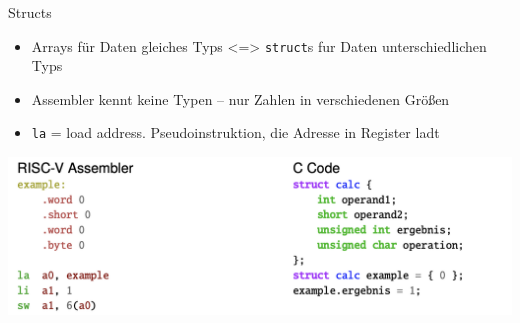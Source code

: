 \documentclass[
  german,            %
  aspectratio=169,    %
]{tumbeamer}
\begin{document}
\begin{frame}[c]{Structs}{}
  \begin{itemize}
    \item Arrays für Daten gleiches Typs <=> \texttt{struct}s fur Daten unterschiedlichen Typs 
    \item Assembler kennt keine Typen -- nur Zahlen in verschiedenen Größen
    \item \texttt{la} = load address. Pseudoinstruktion, die Adresse in Register ladt
  \end{itemize}
  \vspace{0.4cm}
  \includegraphics[width=\linewidth]{strutcs_comparison.png}
\end{frame} 
\end{document}
